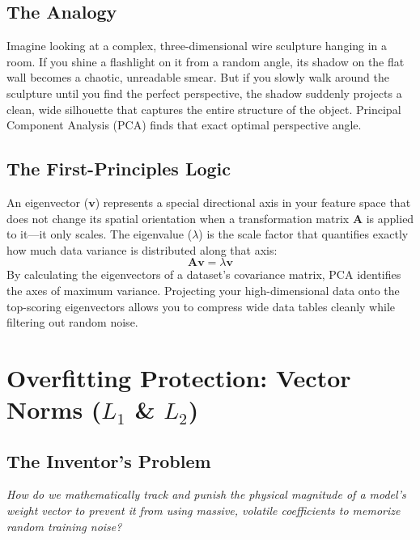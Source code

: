 \documentclass[12pt,a4paper]{article}
\begin{document}
\subsection*{The Analogy}
Imagine looking at a complex, three-dimensional wire sculpture hanging in a room. If you shine a flashlight on it from a random angle, its shadow on the flat wall becomes a chaotic, unreadable smear. But if you slowly walk around the sculpture until you find the perfect perspective, the shadow suddenly projects a clean, wide silhouette that captures the entire structure of the object. Principal Component Analysis (PCA) finds that exact optimal perspective angle.

\subsection*{The First-Principles Logic}
An eigenvector ($\mathbf{v}$) represents a special directional axis in your feature space that does not change its spatial orientation when a transformation matrix $\mathbf{A}$ is applied to it—it only scales. The eigenvalue ($\lambda$) is the scale factor that quantifies exactly how much data variance is distributed along that axis:
$$\mathbf{A}\mathbf{v} = \lambda\mathbf{v}$$
By calculating the eigenvectors of a dataset's covariance matrix, PCA identifies the axes of maximum variance. Projecting your high-dimensional data onto the top-scoring eigenvectors allows you to compress wide data tables cleanly while filtering out random noise.

\section{Overfitting Protection: Vector Norms ($L_1$ \& $L_2$)}
\subsection*{The Inventor's Problem}
\textit{How do we mathematically track and punish the physical magnitude of a model's weight vector to prevent it from using massive, volatile coefficients to memorize random training noise?}
\end{document}
